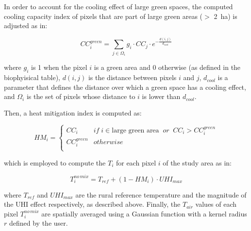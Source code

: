 \documentclass[10pt,letterpaper]{article}
\begin{document}
In order to account for the cooling effect of large green spaces, the computed cooling capacity index of pixels that are part of large green areas ($>$ 2~ha) is adjusted as in:

\begin{equation}
  \label{eq:cooling-capacity-green}
  CC_i^{green} = \sum_{j \in \Omega_i} g_i \cdot CC_j \cdot e^{-\frac{d(i, j)}{d_{cool}}}
\end{equation}

where $g_i$ is 1 when the pixel $i$ is a green area and 0 otherwise (as defined in the biophyisical table), $d(i, j)$ is the distance between pixels $i$ and $j$, $d_{cool}$ is a parameter that defines the distance over which a green space has a cooling effect, and $\Omega_i$ is the set of pixels whose distance to $i$ is lower than $d_{cool}$.

Then, a heat mitigation index is computed as:

\begin{equation}
  \label{eq:heat-mitigation index}
  HM_i=\begin{cases}
    CC_i & if \; i \in \textrm{large green area} \;\; or \;\; CC_i > CC_i^{green} \\
    CC_i^{green} & otherwise \\
  \end{cases}
\end{equation}

which is employed to compute the $T_i$ for each pixel $i$ of the study area as in:

\begin{equation}
  \label{eq:tair-nomix}
  T_i^{no \, mix} = T_{ref} + (1 - HM_i) \cdot UHI_{max}
\end{equation}

where $T_{ref}$ and $UHI_{max}$ are the rural reference temperature and the magnitude of the UHI effect respectively, as described above.
Finally, the $T_{air}$ values of each pixel $T_i^{no \, mix}$ are spatially averaged using a Gaussian function with a kernel radius $r$ defined by the user.
\end{document}
